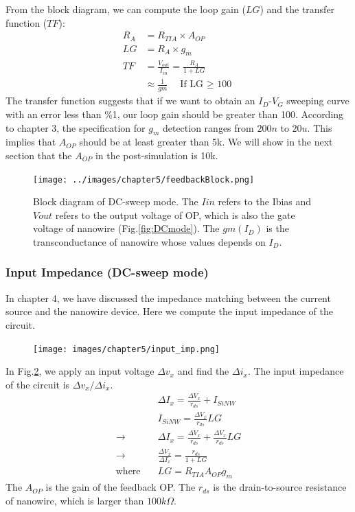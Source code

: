 {From the block diagram, we can compute the loop gain ($LG$) and the transfer function ($TF$):
\begin{align}
    R_A &= R_{TIA} \times A_{OP} \label{eq:TF_RA}\\
    LG &=  R_A \times g_m \label{eq:TF_LG}\\
    TF &= \frac{V_{out}}{I_{in}} =  \frac{R_A}{1 + LG} \label{eq:TF}\\
    &\approx \frac{1}{gm} \quad \text{If LG $\geq$ 100} \label{eq:TF_gm}
\end{align}
The transfer function suggests that if we want to obtain an $I_D$-$V_G$ sweeping curve with an error less than \%1, our loop gain should be greater than 100.
According to chapter 3, the specification for $g_m$ detection ranges from $200n$ to $20u$.
This implies that $A_{OP}$ should be at least greater than 5k.
We will show in the next section that the $A_{OP}$ in the post-simulation is 10k.
\begin{figure}[!htb]
    \centering
    \texttt{[image: ../images/chapter5/feedbackBlock.png]}
    \caption{Block diagram of DC-sweep mode. The $Iin$ refers to the Ibias and $Vout$ refers to the output voltage of OP, which is also the gate voltage of nanowire (Fig.\ref{fig:DCmode}). The $gm(I_D)$ is the transconductance of nanowire whose values depends on $I_D$.}
    \label{fig:feedblock}
\end{figure}

\subsubsection{Input Impedance (DC-sweep mode)}
In chapter 4, we have discussed the impedance matching between the current source and the nanowire device.
Here we compute the input impedance of the circuit.

\begin{figure}[!htbp]
    \centering
        \texttt{[image: images/chapter5/input\_imp.png]}
    \caption{}
    \label{fig:input_imp}
\end{figure}
In Fig.\ref{fig:input_imp}, we apply an input voltage $\Delta v_x$ and find the $\Delta i_x$.
The input impedance of the circuit is $\Delta v_x / \Delta i_x$.
\begin{align}
    & \Delta I_x = \frac{\Delta V_x}{r_{ds}} + I_{SiNW} \\
    & I_{SiNW} = \frac{\Delta V_x}{r_{ds}} LG \\
    \rightarrow \quad & \Delta I_x = \frac{\Delta V_x}{r_{ds}} + \frac{\Delta V_x}{r_{ds}} LG \\
    \rightarrow \quad & \frac{\Delta V_x}{\Delta I_x} = \frac{r_{ds}}{1 + LG} \label{eq:input_imp} \\
    \text{where}\quad & LG = R_{TIA}A_{OP} g_m
\end{align}
The $A_{OP}$ is the gain of the feedback OP.
The $r_{ds}$ is the drain-to-source resistance of nanowire, which is larger than $100k\Omega$.

}
